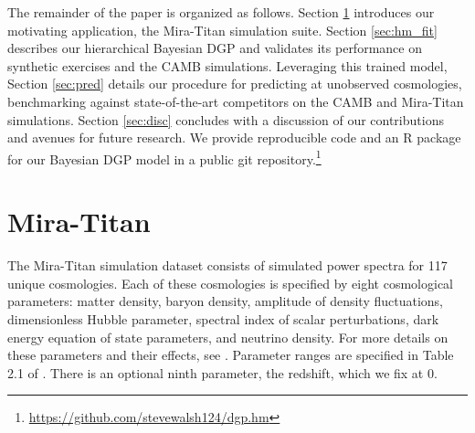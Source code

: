 \documentclass[11pt]{article}
\begin{document}
The remainder of the paper is organized as follows.  Section \ref{sec:data} 
introduces our motivating application, the Mira-Titan simulation suite.  
Section \ref{sec:hm_fit} describes our hierarchical Bayesian DGP and 
validates its performance on synthetic exercises and the CAMB simulations.  
Leveraging this trained model, Section \ref{sec:pred} details 
our procedure for predicting at unobserved cosmologies, benchmarking against
state-of-the-art competitors on the CAMB and Mira-Titan simulations. 
Section \ref{sec:disc} concludes with a discussion of our contributions and avenues for 
future research.  We provide reproducible code and an {\sf R} package for our 
Bayesian DGP model in a public git repository.\footnote{\url{https://github.com/stevewalsh124/dgp.hm}}



\section{Mira-Titan}
\label{sec:data}

The Mira-Titan simulation dataset consists of simulated power spectra for 
117 unique cosmologies. Each of these cosmologies is specified by eight cosmological 
parameters: matter density, baryon density, amplitude of density fluctuations, 
dimensionless Hubble parameter, spectral index of scalar perturbations,
dark energy equation of state parameters, and neutrino density. For more details 
on these parameters and their effects, see \cite{dodelson2020modern, aghanim2020planck, heitmann2016mira}. 
Parameter ranges are specified in Table 2.1 of \cite{moran2023mira}.
There is an optional ninth parameter, the redshift, which we fix at 0.
\end{document}

